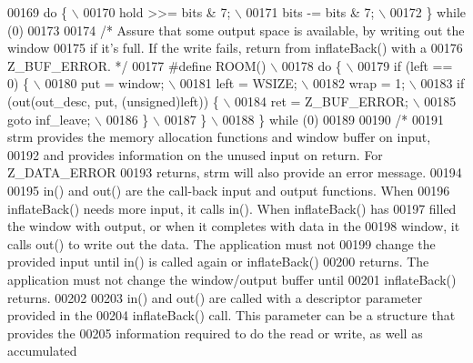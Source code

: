 \begin{DoxyCode}
{{{{00169 \textcolor{preprocessor}{    do \{ \(\backslash\)}
00170 \textcolor{preprocessor}{        hold >>= bits & 7; \(\backslash\)}
00171 \textcolor{preprocessor}{        bits -= bits & 7; \(\backslash\)}
00172 \textcolor{preprocessor}{    \} while (0)}
00173 
00174 \textcolor{comment}{/* Assure that some output space is available, by writing out the window}
00175 \textcolor{comment}{   if it's full.  If the write fails, return from inflateBack() with a}
00176 \textcolor{comment}{   Z\_BUF\_ERROR. */}
00177 \textcolor{preprocessor}{#define ROOM() \(\backslash\)}
00178 \textcolor{preprocessor}{    do \{ \(\backslash\)}
00179 \textcolor{preprocessor}{        if (left == 0) \{ \(\backslash\)}
00180 \textcolor{preprocessor}{            put = window; \(\backslash\)}
00181 \textcolor{preprocessor}{            left = WSIZE; \(\backslash\)}
00182 \textcolor{preprocessor}{            wrap = 1; \(\backslash\)}
00183 \textcolor{preprocessor}{            if (out(out\_desc, put, (unsigned)left)) \{ \(\backslash\)}
00184 \textcolor{preprocessor}{                ret = Z\_BUF\_ERROR; \(\backslash\)}
00185 \textcolor{preprocessor}{                goto inf\_leave; \(\backslash\)}
00186 \textcolor{preprocessor}{            \} \(\backslash\)}
00187 \textcolor{preprocessor}{        \} \(\backslash\)}
00188 \textcolor{preprocessor}{    \} while (0)}
00189 
00190 \textcolor{comment}{/*}
00191 \textcolor{comment}{   strm provides the memory allocation functions and window buffer on input,}
00192 \textcolor{comment}{   and provides information on the unused input on return.  For Z\_DATA\_ERROR}
00193 \textcolor{comment}{   returns, strm will also provide an error message.}
00194 \textcolor{comment}{}
00195 \textcolor{comment}{   in() and out() are the call-back input and output functions.  When}
00196 \textcolor{comment}{   inflateBack() needs more input, it calls in().  When inflateBack() has}
00197 \textcolor{comment}{   filled the window with output, or when it completes with data in the}
00198 \textcolor{comment}{   window, it calls out() to write out the data.  The application must not}
00199 \textcolor{comment}{   change the provided input until in() is called again or inflateBack()}
00200 \textcolor{comment}{   returns.  The application must not change the window/output buffer until}
00201 \textcolor{comment}{   inflateBack() returns.}
00202 \textcolor{comment}{}
00203 \textcolor{comment}{   in() and out() are called with a descriptor parameter provided in the}
00204 \textcolor{comment}{   inflateBack() call.  This parameter can be a structure that provides the}
00205 \textcolor{comment}{   information required to do the read or write, as well as accumulated}
}}}}
\end{DoxyCode}
